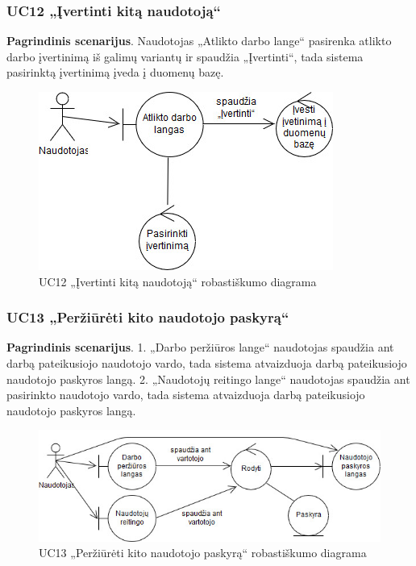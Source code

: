 \documentclass{VUMIFPSbakalaurinis}
\begin{document}
\subsubsection{UC12 „Įvertinti kitą naudotoją“}
\textbf{Pagrindinis scenarijus}. Naudotojas „Atlikto darbo lange“ pasirenka atlikto darbo įvertinimą iš galimų variantų ir spaudžia „Įvertinti“, tada sistema pasirinktą įvertinimą įveda į duomenų bazę.

\begin{figure}[H]
	\centering
	\includegraphics[scale=0.6]{img/Robustness/UC12}
	\caption{UC12 „Įvertinti kitą naudotoją“ robastiškumo diagrama}
	\label{img:uc12rob}
\end{figure}

\subsubsection{UC13 „Peržiūrėti kito naudotojo paskyrą“}
\textbf{Pagrindinis scenarijus}. 1. „Darbo peržiūros lange“ naudotojas spaudžia ant darbą pateikusiojo naudotojo vardo, tada sistema atvaizduoja darbą pateikusiojo naudotojo paskyros langą.
2. „Naudotojų reitingo lange“ naudotojas spaudžia ant pasirinkto naudotojo vardo, tada sistema atvaizduoja darbą pateikusiojo naudotojo paskyros langą.

\begin{figure}[H]
	\centering
	\includegraphics[scale=0.6]{img/Robustness/UC13}
	\caption{UC13 „Peržiūrėti kito naudotojo paskyrą“ robastiškumo diagrama}
	\label{img:uc13rob}
\end{figure}
\end{document}
